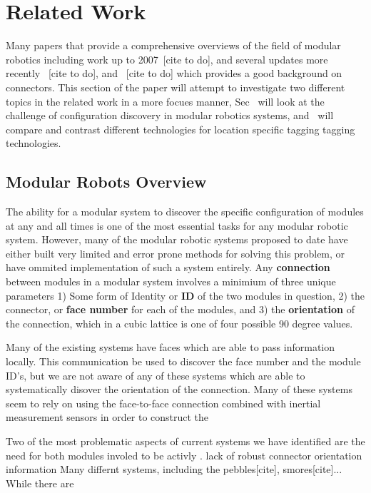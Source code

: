 \section{Related Work}
\label{sec:RelatedWork}

Many papers that provide a comprehensive overviews of the field of modular robotics including work up to 2007~[cite to do], and several updates more recently ~[cite to do], and ~[cite to do] which provides a good background on connectors. This section of the paper will attempt to investigate two different topics in the related work in a more focues manner, Sec~\label{sec:RWconfiguration} will look at the challenge of configuration discovery in modular robotics systems, and~\label{sec:RWtaggingTech} will compare and contrast different technologies for location specific tagging tagging technologies.


\subsection{Modular Robots Overview}
\label{sec:RWconfiguration}
	The ability for a modular system to discover the specific configuration of modules at any and all times is one of the most essential tasks for any modular robotic system. However, many of the modular robotic systems proposed to date have either built very limited and error prone methods for solving this problem, or have ommited implementation of such a system entirely. Any \textbf{connection} between modules in a modular system involves a minimium of three unique parameters 1) Some form of Identity or \textbf{ID} of the two modules in question, 2) the connector, or \textbf{face number} for each of the modules, and 3) the \textbf{orientation} of the connection, which in a cubic lattice is one of four possible 90 degree values.
		
	Many of the existing systems have faces which are able to pass information locally. This communication be used to discover the face number and the module ID's, but we are not aware of any of these systems which are able to systematically disover the orientation of the connection. Many of these systems seem to rely on using the face-to-face connection combined with inertial measurement sensors in order to construct the 
	
	Two of the most problematic aspects of current systems we have identified are the need for both modules involed to be activly . lack of robust connector orientation information
	Many differnt systems, including the pebbles[cite], smores[cite]... While there are 

